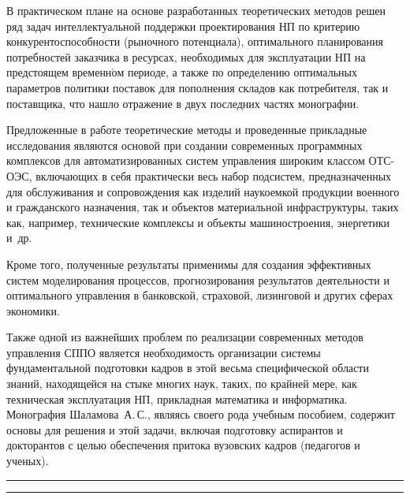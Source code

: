 \begin{multicols}{2}
{     В практическом плане на основе разработанных тео\-ре\-ти\-че\-ских методов решен ряд задач
интеллектуальной поддержки проектирования НП по критерию кон\-курентоспособности
(рыночного потенциала), опти\-мального планирования потребностей заказчика в ресурсах,
необходимых для эксплуатации НП на предстоящем временн$\acute{\mbox{о}}$м периоде, а также по
определению %
оптимальных параметров политики поставок для пополнения складов как
потребителя, так и поставщика, что нашло отражение в двух последних частях моно\-графии.
{

}

     Предложенные в работе теоретические методы и проведенные прикладные исследования
являются основой при создании современных программных комплексов для
автоматизированных систем управления широким классом ОТС-ОЭС, включающих в себя
практически весь набор подсистем, предназначенных для обслуживания и сопровождения как
изделий наукоемкой продукции военного и гражданского назначения, так и объектов
     материальной инфраструктуры, таких как, например, технические комплексы и объекты
машиностроения, энергетики и~др.

Кроме того, полученные результаты применимы для
создания эффективных сис\-тем моделирования процессов, прогнозирования результатов
деятельности и оптимального управления в банковской, страховой, лизинговой и других
сферах экономики.

     Также одной из важнейших проблем по реализации современных методов управления
СППО является необходимость  организации системы  фундаментальной подготовки кадров в
этой весьма специфической области знаний, находящейся на стыке многих наук, таких, по
крайней мере, как техническая эксплуатация НП,  прикладная математика и информатика.
Монография Шаламова~А.\,С., являясь своего рода учебным пособием, содержит основы для
решения и этой задачи, включая подготовку аспирантов и докторантов с целью обеспечения
притока вузовских кадров (педагогов и ученых).
}

\end{multicols}



\vspace*{9pt}

\hrule

\vspace*{3pt}

\hrule



